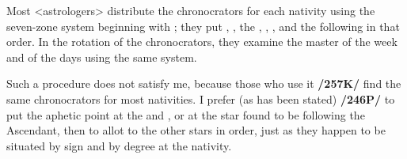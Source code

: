 Most <astrologers> distribute the chronocrators for each nativity using the seven-zone system beginning with \Saturn; they put \Jupiter, \Mars, the \Sun, \Venus, \Mercury, and the \Moon\xspace following in that order. In the rotation of the chronocrators, they examine the master of the week and of the days using the same system. 

Such a procedure does not satisfy me, because those who use it \textbf{/257K/} find the same chronocrators for most nativities. I prefer (as has been stated) \textbf{/246P/} to put the aphetic point at the \Sun\xspace and \Moon, or at the star found to be following the Ascendant, then to allot to the other stars in order, just as they happen to be situated by sign and by degree at the nativity.

\newpage